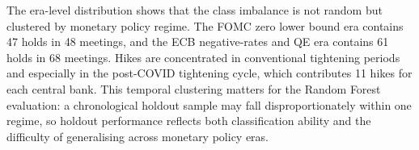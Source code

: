 The era-level distribution shows that the class imbalance is not random but clustered
by monetary policy regime. The FOMC zero lower bound era contains 47 holds in 48
meetings, and the ECB negative-rates and QE era contains 61 holds in 68 meetings. Hikes
are concentrated in conventional tightening periods and especially in the post-COVID
tightening cycle, which contributes 11 hikes for each central bank. This temporal
clustering matters for the Random Forest evaluation: a chronological holdout sample may
fall disproportionately within one regime, so holdout performance reflects both
classification ability and the difficulty of generalising across monetary policy eras.

